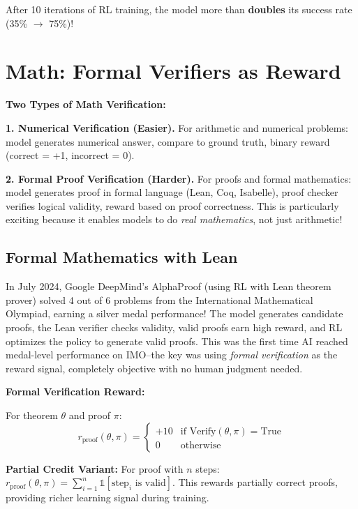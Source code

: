 \begin{chapterenv}
\begin{infobox}
After 10 iterations of RL training, the model more than \textbf{doubles} its success rate (35\% $\to$ 75\%)!
\end{infobox}

\section{Math: Formal Verifiers as Reward}

\textbf{Two Types of Math Verification:}

\textbf{1. Numerical Verification (Easier).} For arithmetic and numerical problems: model generates numerical answer, compare to ground truth, binary reward (correct = +1, incorrect = 0).

\textbf{2. Formal Proof Verification (Harder).} For proofs and formal mathematics: model generates proof in formal language (Lean, Coq, Isabelle), proof checker verifies logical validity, reward based on proof correctness. This is particularly exciting because it enables models to do \textit{real mathematics}, not just arithmetic!

\subsection{Formal Mathematics with Lean}

In July 2024, Google DeepMind's AlphaProof (using RL with Lean theorem prover) solved 4 out of 6 problems from the International Mathematical Olympiad, earning a silver medal performance! The model generates candidate proofs, the Lean verifier checks validity, valid proofs earn high reward, and RL optimizes the policy to generate valid proofs. This was the first time AI reached medal-level performance on IMO--the key was using \textit{formal verification} as the reward signal, completely objective with no human judgment needed.

\begin{infobox}
\textbf{Formal Verification Reward:}

For theorem $\theta$ and proof $\pi$:
$$r_{\text{proof}}(\theta, \pi) = \begin{cases} 
+10 & \text{if } \text{Verify}(\theta, \pi) = \text{True} \\
0 & \text{otherwise}
\end{cases}$$

\textbf{Partial Credit Variant:} For proof with $n$ steps: $r_{\text{proof}}(\theta, \pi) = \sum_{i=1}^n \mathbb{1}[\text{step}_i \text{ is valid}]$. This rewards partially correct proofs, providing richer learning signal during training.


\end{infobox}
\end{chapterenv}
